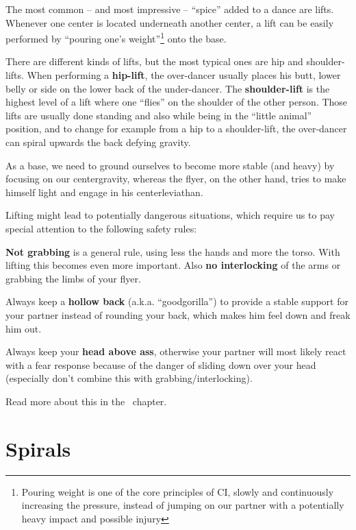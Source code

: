 The most common -- and most impressive -- ``spice'' added to a dance are lifts.
Whenever one center is located underneath another center, a lift can be easily performed by ``pouring one's weight''\footnote{Pouring weight is one of the core principles of CI, slowly and continuously increasing the pressure, instead of jumping on our partner with a potentially heavy impact and possible injury} onto the base.

There are different kinds of lifts, but the most typical ones are hip and shoulder-lifts.
When performing a \textbf{hip-lift}, the \gls{over-dancer} usually places his butt, lower belly or side on the lower back of the \gls{under-dancer}.
The \textbf{shoulder-lift} is the highest level of a lift where one ``flies'' on the shoulder of the other person.
Those lifts are usually done standing and also while being in the ``little animal'' position, and to change for example from a hip to a shoulder-lift, the over-dancer can spiral upwards the back defying gravity.

As a base, we need to ground ourselves to become more stable (and heavy) by focusing on our \gls{centergravity},
whereas the flyer, on the other hand, tries to make himself light and engage in his \gls{centerleviathan}.

Lifting might lead to potentially dangerous situations, which require us to pay special attention to the following safety rules:

\begin{itemize*}
    \item \textbf{Not grabbing} is a general rule, using less the hands and more the torso.
        With lifting this becomes even more important. Also \textbf{no interlocking} of the arms or grabbing the limbs of your flyer.
    \item Always keep a \textbf{hollow back} (a.k.a. ``\gls{goodgorilla}'') to provide a stable support for your partner instead of rounding your back, which makes him feel down and freak him out.
    \item Always keep your \textbf{head above ass}, otherwise your partner will most likely react with a fear response because of the danger of sliding down over your head (especially don't combine this with grabbing/interlocking).
\end{itemize*}

Read more about this in the~ chapter.

\section{Spirals}\label{sec:spirals}

